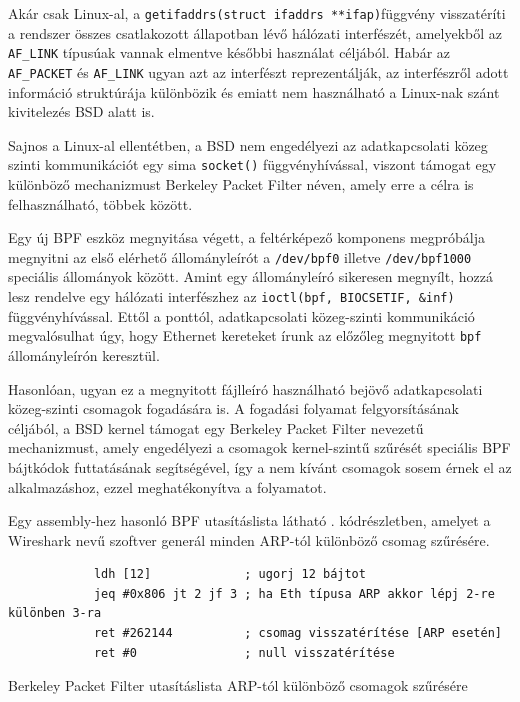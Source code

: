 	Akár csak Linux-al, a \texttt{getifaddrs(struct ifaddrs **ifap)}függvény visszatéríti a rendszer összes csatlakozott állapotban lévő hálózati interfészét, amelyekből az \texttt{AF_LINK} típusúak vannak elmentve későbbi használat céljából. Habár az \texttt{AF_PACKET} és \texttt{AF_LINK} ugyan azt az interfészt reprezentálják, az interfészről adott információ struktúrája különbözik és emiatt nem használható a Linux-nak szánt kivitelezés BSD alatt is.
	
	Sajnos a Linux-al ellentétben, a BSD nem engedélyezi az adatkapcsolati közeg szinti kommunikációt egy sima  \texttt{socket()} függvényhívással, viszont támogat egy különböző mechanizmust Berkeley Packet Filter néven, amely erre a célra is felhasználható, többek között.
	
	Egy új BPF eszköz megnyitása végett, a feltérképező komponens megpróbálja megnyitni az első elérhető állományleírót a \texttt{/dev/bpf0} illetve \texttt{/dev/bpf1000} speciális állományok között. Amint egy állományleíró sikeresen megnyílt, hozzá lesz rendelve egy hálózati interfészhez az \texttt{ioctl(bpf, BIOCSETIF, &inf)} függvényhívással. Ettől a ponttól, adatkapcsolati közeg-szinti kommunikáció megvalósulhat úgy, hogy Ethernet kereteket írunk az előzőleg megnyitott \texttt{bpf} állományleírón keresztül.
	
	Hasonlóan, ugyan ez a megnyitott fájlleíró használható bejövő adatkapcsolati közeg-szinti csomagok fogadására is. A fogadási folyamat felgyorsításának céljából, a BSD kernel támogat egy Berkeley Packet Filter nevezetű mechanizmust, amely engedélyezi a csomagok kernel-szintű szűrését speciális BPF bájtkódok futtatásának segítségével, így a nem kívánt csomagok sosem érnek el az alkalmazáshoz, ezzel meghatékonyítva a folyamatot.
	
	Egy assembly-hez hasonló BPF utasításlista látható \az{\ref{bpfasm}}. kódrészletben, amelyet a Wireshark nevű szoftver generál minden ARP-tól különböző csomag szűrésére.
	
	\begin{listing}[H]
		\begin{verbatim}
			ldh [12]             ; ugorj 12 bájtot
			jeq #0x806 jt 2 jf 3 ; ha Eth típusa ARP akkor lépj 2-re különben 3-ra
			ret #262144          ; csomag visszatérítése [ARP esetén]
			ret #0               ; null visszatérítése
		\end{verbatim}
		\caption{Berkeley Packet Filter utasításlista ARP-tól különböző csomagok szűrésére}
		\label{bpfasm}
	\end{listing}
	
